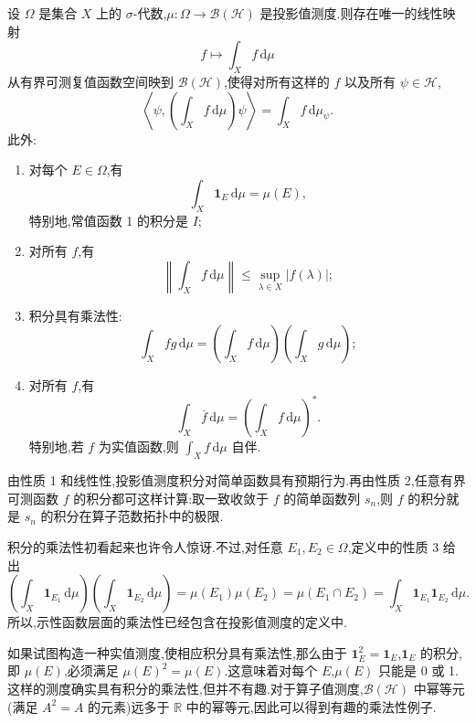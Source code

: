 \begin{proposition}[算子值积分]\label{prop:operator-valued-integration}
设 \(\Omega\) 是集合 \(X\) 上的 \(\sigma\)-代数,\(\mu:\Omega\to\mathcal{B}(\mathcal{H})\) 是投影值测度.则存在唯一的线性映射
\[
f\longmapsto\int_{X}f\,\mathrm{d}\mu
\]
从有界可测复值函数空间映到 \(\mathcal{B}(\mathcal{H})\),使得对所有这样的 \(f\) 以及所有 \(\psi\in\mathcal{H}\),
\[
\left\langle\psi,\left(\int_{X}f\,\mathrm{d}\mu\right)\psi\right\rangle
=\int_{X}f\,\mathrm{d}\mu_{\psi}.
\label{eq:operator-valued-integral-definition}
\]
此外:
\begin{enumerate}
\item 对每个 \(E\in\Omega\),有
\[
\int_{X}\mathbf{1}_{E}\,\mathrm{d}\mu=\mu(E),
\]
特别地,常值函数 1 的积分是 \(I\);
\item 对所有 \(f\),有
\[
\left\|\int_{X}f\,\mathrm{d}\mu\right\|
\leq\sup_{\lambda\in X}|f(\lambda)|;
\label{eq:operator-valued-integral-bound}
\]
\item 积分具有乘法性:
\[
\int_{X}fg\,\mathrm{d}\mu
=\left(\int_{X}f\,\mathrm{d}\mu\right)
 \left(\int_{X}g\,\mathrm{d}\mu\right);
\label{eq:operator-valued-integral-multiplicative}
\]
\item 对所有 \(f\),有
\[
\int_{X}\overline{f}\,\mathrm{d}\mu
=\left(\int_{X}f\,\mathrm{d}\mu\right)^{*}.
\]
特别地,若 \(f\) 为实值函数,则 \(\int_{X}f\,\mathrm{d}\mu\) 自伴.
\end{enumerate}
\end{proposition}

由性质 1 和线性性,投影值测度积分对简单函数具有预期行为.再由性质 2,任意有界可测函数 \(f\) 的积分都可这样计算:取一致收敛于 \(f\) 的简单函数列 \(s_{n}\),则 \(f\) 的积分就是 \(s_{n}\) 的积分在算子范数拓扑中的极限.

积分的乘法性初看起来也许令人惊讶.不过,对任意 \(E_{1},E_{2}\in\Omega\),定义中的性质 3 给出
\[
\left(\int_{X}\mathbf{1}_{E_{1}}\,\mathrm{d}\mu\right)
\left(\int_{X}\mathbf{1}_{E_{2}}\,\mathrm{d}\mu\right)
=\mu(E_{1})\mu(E_{2})=\mu(E_{1}\cap E_{2})
=\int_{X}\mathbf{1}_{E_{1}}\mathbf{1}_{E_{2}}\,\mathrm{d}\mu.
\]
所以,示性函数层面的乘法性已经包含在投影值测度的定义中.

如果试图构造一种实值测度,使相应积分具有乘法性,那么由于 \(\mathbf{1}_{E}^{2}=\mathbf{1}_{E}\),\(\mathbf{1}_{E}\) 的积分,即 \(\mu(E)\),必须满足 \(\mu(E)^{2}=\mu(E)\).这意味着对每个 \(E\),\(\mu(E)\) 只能是 0 或 1.这样的测度确实具有积分的乘法性,但并不有趣.对于算子值测度,\(\mathcal{B}(\mathcal{H})\) 中幂等元(满足 \(A^{2}=A\) 的元素)远多于 \(\mathbb{R}\) 中的幂等元,因此可以得到有趣的乘法性例子.

